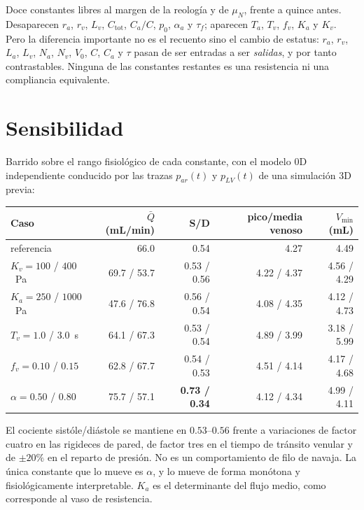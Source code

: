 \documentclass[11pt]{article}
\begin{document}
\noindent
Doce constantes libres al margen de la reolog\'ia y de $\mu_N$, frente a quince
antes. Desaparecen $r_a$, $r_v$, $L_v$, $C_{\text{tot}}$, $C_a/C$, $p_0$,
$\alpha_a$ y $\tau_f$; aparecen $T_a$, $T_v$, $f_v$, $K_a$ y $K_v$. Pero la
diferencia importante no es el recuento sino el cambio de estatus: $r_a$, $r_v$,
$L_a$, $L_v$, $N_a$, $N_v$, $V_0$, $C$, $C_a$ y $\tau$ pasan de ser entradas a
ser \emph{salidas}, y por tanto contrastables. Ninguna de las constantes
restantes es una resistencia ni una compliancia equivalente.

\section{Sensibilidad}
\label{sec:sens}

Barrido sobre el rango fisiol\'ogico de cada constante, con el modelo 0D
independiente conducido por las trazas $p_{ar}(t)$ y $p_{LV}(t)$ de una
simulaci\'on 3D previa:

\begin{center}\small
\begin{tabular}{lrrrr}
\toprule
Caso & $\bar Q$ (mL/min) & S/D & pico/media venoso & $V_{\min}$ (mL)\\
\midrule
referencia            & 66.0 & 0.54 & 4.27 & 4.49\\
$K_v=100$ / $400$~Pa  & 69.7 / 53.7 & 0.53 / 0.56 & 4.22 / 4.37 & 4.56 / 4.29\\
$K_a=250$ / $1000$~Pa & 47.6 / 76.8 & 0.56 / 0.54 & 4.08 / 4.35 & 4.12 / 4.73\\
$T_v=1.0$ / $3.0$~s   & 64.1 / 67.3 & 0.53 / 0.54 & 4.89 / 3.99 & 3.18 / 5.99\\
$f_v=0.10$ / $0.15$   & 62.8 / 67.7 & 0.54 / 0.53 & 4.51 / 4.14 & 4.17 / 4.68\\
$\alpha=0.50$ / $0.80$& 75.7 / 57.1 & \textbf{0.73 / 0.34} & 4.12 / 4.34 & 4.99 / 4.11\\
\bottomrule
\end{tabular}
\end{center}

\noindent
El cociente sist\'ole/di\'astole se mantiene en $0.53$--$0.56$ frente a
variaciones de factor cuatro en las rigideces de pared, de factor tres en el
tiempo de tr\'ansito venular y de $\pm20\%$ en el reparto de presi\'on. No es un
comportamiento de filo de navaja. La \'unica constante que lo mueve es $\alpha$,
y lo mueve de forma mon\'otona y fisiol\'ogicamente interpretable. $K_a$ es el
determinante del flujo medio, como corresponde al vaso de resistencia.
\end{document}
